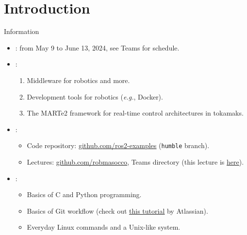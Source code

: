 
\section{Introduction}
\graphicspath{{figs/section1/}}

\begin{frame}{Information}
	\begin{itemize}
		\item {}: from May 9 to June 13, 2024, see Teams for schedule.
		\item {}:
		      \begin{enumerate}
			      \item Middleware for robotics and more.
			      \item Development tools for robotics (\emph{e.g.}, Docker).
			      \item The MARTe2 framework for real-time control architectures in tokamaks.
		      \end{enumerate}
		\item {}:
		      \begin{itemize}
			      \item Code repository: \href{https://github.com/IntelligentSystemsLabUTV/ros2-examples}{\color{blue}\underline{github.com/ros2-examples}} (\texttt{humble} branch).
			      \item Lectures: \href{https://github.com/stars/robmasocco/lists/lectures}{\color{blue}\underline{github.com/robmasocco}}, Teams directory (this lecture is \href{https://github.com/robmasocco/DAFN24_Robotics_1}{\color{blue}\underline{here}}).
		      \end{itemize}
		\item {}:
		      \begin{itemize}
			      \item Basics of C and Python programming.
			      \item Basics of Git workflow (check out \href{https://www.atlassian.com/git/tutorials/what-is-git}{\color{blue}\underline{this tutorial}} by Atlassian).
			      \item Everyday Linux commands and a Unix-like system.
		      \end{itemize}
	\end{itemize}
\end{frame}

